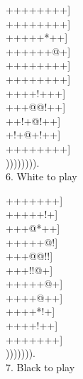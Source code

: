 \documentclass[mcrownvopaper,10pt,twopage,onecolumn,final]{memoir}
\begin{document}
\begin{figure}[ht]
    \begin{minipage}[c]{0.5\linewidth}
        \centering    
        {\gnos%
        ++++++++]\\
        ++++++++]\\
        +++++*++]\\
        ++++++@+]\\
        ++++++++]\\
        ++++++++]\\
        ++++!+++]\\
        +++@@!++]\\
        ++!+@!++]\\
        +!+@+!++]\\
        ++++++++]\\
        )))))))).\\
        }
        6. White to play
    \end{minipage}%
    \begin{minipage}[c]{0.5\linewidth}
        \centering    
        {\gnos%
        +++++++]\\
        +++++!+]\\
        +++@*++]\\
        +++++@!]\\
        +++@@!!]\\
        +++!!@+]\\
        +++++@+]\\
        ++++@++]\\
        ++++*!+]\\
        ++++!++]\\
        +++++++]\\
        ))))))).\\
        }
        7. Black to play
    \end{minipage}
\end{figure}
\end{document}
